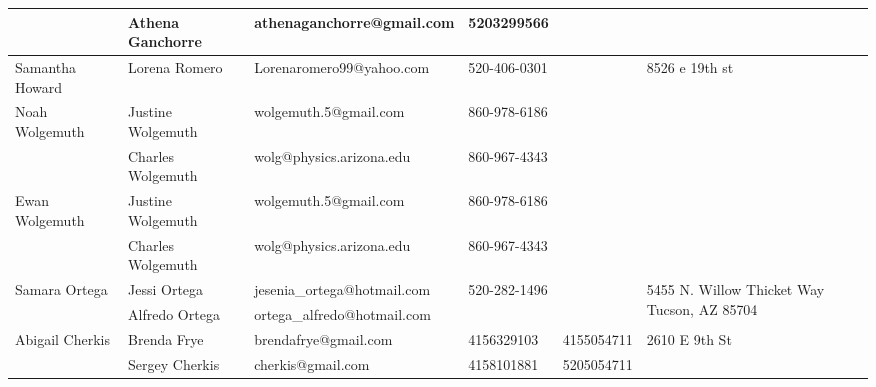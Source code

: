 \documentclass[landscape]{article}\usepackage[]{graphicx}\usepackage[]{color}
\begin{document}
\begin{longtable}{p{70pt}|p{75pt}|p{120pt}|p{60pt}|p{60pt}|p{120pt}|}
 & Athena Ganchorre & athenaganchorre@gmail.com & 5203299566 &  & \\
\hline
\multirow{2}{70pt}{Samantha Howard } & Lorena Romero  & Lorenaromero99@yahoo.com  & 520-406-0301 &  & \multirow{2}{100pt}{8526 e 19th st} \\
 &  &  &  &  & \\
\hline
\multirow{2}{70pt}{Noah Wolgemuth} & Justine Wolgemuth & wolgemuth.5@gmail.com & 860-978-6186 &  & \multirow{2}{100pt}{} \\
 & Charles Wolgemuth & wolg@physics.arizona.edu & 860-967-4343 &  & \\
\hline
\multirow{2}{70pt}{Ewan Wolgemuth} & Justine Wolgemuth & wolgemuth.5@gmail.com & 860-978-6186 &  & \multirow{2}{100pt}{} \\
 & Charles Wolgemuth & wolg@physics.arizona.edu & 860-967-4343 &  & \\
\hline
\multirow{2}{70pt}{Samara Ortega} & Jessi Ortega & jesenia\_ortega@hotmail.com & 520-282-1496 &  & \multirow{2}{100pt}{5455 N. Willow Thicket Way Tucson, AZ 85704} \\
 & Alfredo Ortega & ortega\_alfredo@hotmail.com &  &  & \\
\hline
\multirow{2}{70pt}{Abigail Cherkis} & Brenda Frye & brendafrye@gmail.com & 4156329103 & 4155054711 & \multirow{2}{100pt}{2610 E 9th St} \\
 & Sergey Cherkis & cherkis@gmail.com & 4158101881 & 5205054711 & \\
\hline
\end{longtable}
\newpage

\hline
\end{document}
